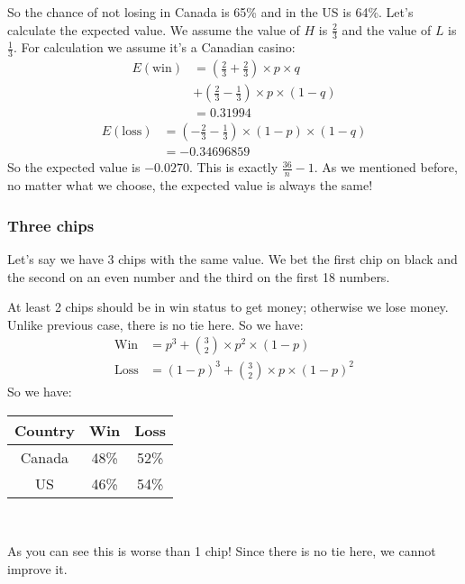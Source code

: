 \documentclass{book}
\begin{document}
	\par
	So the chance of not losing in Canada is 65\% and in the US is 64\%. Let's calculate the expected value. We assume the value of $H$ is $\frac{2}{3}$ and the value of $L$ is $\frac{1}{3}$. For calculation we assume it's a Canadian casino:
	\begin{equation*}
		\begin{split}
			E(\text{win}) &= (\frac{2}{3} + \frac{2}{3}) \times p \times q \\
			&+ (\frac{2}{3} - \frac{1}{3}) \times p \times (1 - q) \\
			&= 0.31994
		\end{split}
	\end{equation*}
	\begin{equation*}
		\begin{split}
			E(\text{loss}) &= (-\frac{2}{3} - \frac{1}{3}) \times (1 - p) \times (1 - q) \\
			&= -0.34696859
		\end{split}
	\end{equation*}
	So the expected value is $-0.0270$. This is exactly $\frac{36}{n} - 1$. As we mentioned before, no matter what we choose, the expected value is always the same!
	\subsubsection{Three chips}
	Let's say we have 3 chips with the same value. We bet the first chip on black and the second on an even number and the third on the first 18 numbers.
	\par At least 2 chips should be in win status to get money; otherwise we lose money. Unlike previous case, there is no tie here. So we have:
	\begin{equation*}
		\begin{split}
			\text{Win} &= p^3 + \binom{3}{2} \times p^2 \times (1 - p) \\
			\text{Loss} &= (1 - p)^3 + \binom{3}{2} \times p \times (1 - p)^2
		\end{split}
	\end{equation*}
	So we have: \\
	\par
	\begin{tabular}[h!]{c c c}
	\toprule
	Country & Win & Loss \\
	\midrule
	Canada & 48\% & 52\% \\
	US & 46\% & 54\% \\
	\bottomrule
\end{tabular} \\
	\par
	\par As you can see this is worse than 1 chip! Since there is no tie here, we cannot improve it.
\end{document}
